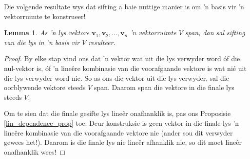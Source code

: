 \documentclass[a4paper,11pt]{book}
\newtheorem{lemma}[theorem]{Lemma}
\theoremstyle{definition}
\newcommand{\ve}[1]{\mathbf{#1}}
\begin{document}
Die volgende resultate wys dat sifting a baie nuttige manier is om 'n basis
vir 'n vektorruimte te konstrueer!

\begin{lemma} 
	\label{sift_lemma_basis} As 'n lys vektore $\ve{v}_1, \ve{v}_2, \ldots,
	\ve{v}_n$ 'n vektorruimte $V$ span, dan sal sifting van die lys in 'n
	basis vir $V$ resulteer.
\end{lemma}
\begin{proof} 
	By elke stap vind ons dat 'n vektor wat uit die lys verwyder word
	{\'o}f die nul-vektor is, {\'o}f 'n line{\^e}re kombinasie van die
	voorafgaande vektore is wat ni{\'e} uit die lys verwyder word nie. So
	as ons die vektor uit die lys verwyder, sal die oorblywende vektore
	steeds $V$ span. Daarom span die vektore in die finale lys steeds $V$.

	Om te sien dat die finale gesifte lys line{\^e}r onafhanklik is, pas
	ons Proposisie \ref{lin_dependence_prop} toe. Deur konstruksie is geen
	vektor in die finale lys 'n line{\^e}re kombinasie van die voorafgaande
	vektore nie (ander sou dit verwyder gewees het!). Daarom is die finale
	lys nie line{\^e}r afhanklik nie, so dit moet line{\^e}r onafhanklik
	wees!
\end{proof}
\end{document}
